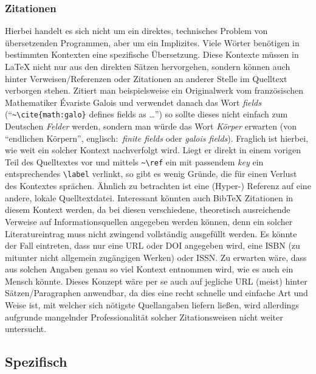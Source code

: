 \subsubsection{Zitationen}\par
Hierbei handelt es sich nicht um ein direktes, technisches Problem von übersetzenden Programmen, aber um ein Implizites. Viele Wörter benötigen in bestimmten Kontexten eine spezifische Übersetzung. Diese Kontexte müssen in \LaTeX{} nicht nur aus den direkten Sätzen hervorgehen, sondern können auch hinter Verweisen/Referenzen oder Zitationen an anderer Stelle im Quelltext verborgen stehen. Zitiert man beispielsweise ein Originalwerk vom französischen Mathematiker Évariste Galois und verwendet danach das Wort \textit{fields} (\enquote{{\verb|~\cite{math:galo}|} defines fields as \ldots}) so sollte dieses nicht einfach zum Deutschen \textit{Felder} werden, sondern man würde das Wort \textit{Körper} erwarten (von \enquote{endlichen Körpern}, englisch:\ \textit{finite fields} oder \textit{galois fields}).
Fraglich ist hierbei, wie weit ein solcher Kontext nachverfolgt wird. Liegt er direkt in einem vorigen Teil des Quelltextes vor und mittels \verb|~\ref| ein mit passendem \textit{key} ein entsprechendes \verb|\label| verlinkt, so gibt es wenig Gründe, die für einen Verlust des Kontextes sprächen. Ähnlich zu betrachten ist eine (Hyper-) Referenz auf eine andere, lokale Quelltextdatei. Interessant könnten auch Bib\TeX{} Zitationen in diesem Kontext werden, da bei diesen verschiedene, theoretisch ausreichende Verweise auf Informationsquellen angegeben werden können, denn ein solcher Literatureintrag muss nicht zwingend vollständig ausgefüllt werden. Es könnte der Fall eintreten, dass nur eine URL oder DOI angegeben wird, eine ISBN (zu mitunter nicht allgemein zugängigen Werken) oder ISSN. Zu erwarten wäre, dass aus solchen Angaben genau so viel Kontext entnommen wird, wie es auch ein Mensch könnte. Dieses Konzept wäre per se auch auf jegliche URL (meist) hinter Sätzen/Paragraphen anwendbar, da dies eine recht schnelle und einfache Art und Weise ist, mit welcher sich nötigste Quellangaben liefern ließen, wird allerdings aufgrunde mangelnder Professionalität solcher Zitationsweisen nicht weiter untersucht.

\subsection{Spezifisch}
